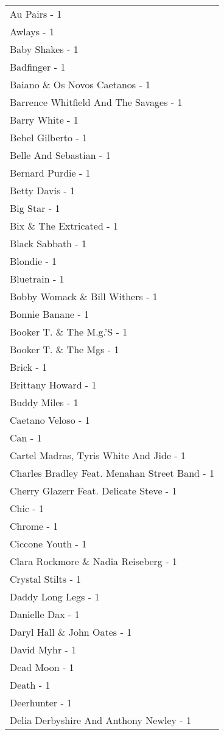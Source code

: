 \documentclass[
]{article}
\begin{document}
\begin{longtable}{l}
Au Pairs - 1 \\ 
Awlays - 1 \\ 
Baby Shakes - 1 \\ 
Badfinger - 1 \\ 
Baiano \& Os Novos Caetanos - 1 \\ 
Barrence Whitfield And The Savages - 1 \\ 
Barry White - 1 \\ 
Bebel Gilberto - 1 \\ 
Belle And Sebastian - 1 \\ 
Bernard Purdie - 1 \\ 
Betty Davis - 1 \\ 
Big Star - 1 \\ 
Bix \& The Extricated - 1 \\ 
Black Sabbath - 1 \\ 
Blondie - 1 \\ 
Bluetrain - 1 \\ 
Bobby Womack \& Bill Withers - 1 \\ 
Bonnie Banane - 1 \\ 
Booker T. \& The M.g.'S - 1 \\ 
Booker T. \& The Mgs - 1 \\ 
Brick - 1 \\ 
Brittany Howard - 1 \\ 
Buddy Miles - 1 \\ 
Caetano Veloso - 1 \\ 
Can - 1 \\ 
Cartel Madras, Tyris White And Jide - 1 \\ 
Charles Bradley Feat. Menahan Street Band - 1 \\ 
Cherry Glazerr Feat. Delicate Steve - 1 \\ 
Chic - 1 \\ 
Chrome - 1 \\ 
Ciccone Youth - 1 \\ 
Clara Rockmore \& Nadia Reiseberg - 1 \\ 
Crystal Stilts - 1 \\ 
Daddy Long Legs - 1 \\ 
Danielle Dax - 1 \\ 
Daryl Hall \& John Oates - 1 \\ 
David Myhr - 1 \\ 
Dead Moon - 1 \\ 
Death - 1 \\ 
Deerhunter - 1 \\ 
Delia Derbyshire And Anthony Newley - 1 \\ 

\end{longtable}
\end{document}
